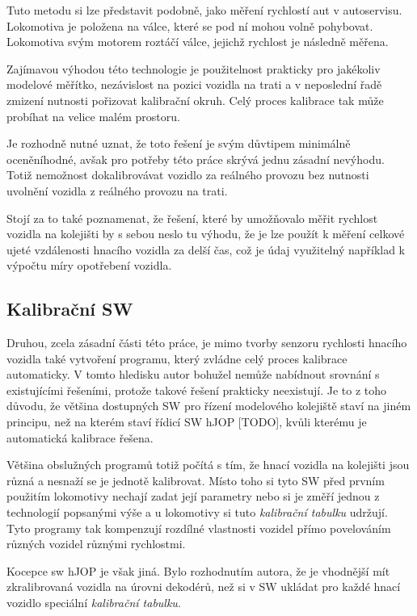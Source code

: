 \documentclass[12pt,a4paper]{article}
\begin{document}
Tuto metodu si lze představit podobně, jako měření rychlostí aut v autoservisu.
Lokomotiva je položena na válce, které se pod ní mohou volně pohybovat. Lokomotiva
svým motorem roztáčí válce, jejichž rychlost je následně měřena.

Zajímavou výhodou této technologie je použitelnost prakticky pro jakékoliv
modelové měřítko, nezávislost na pozici vozidla na trati a v neposlední řadě
zmizení nutnosti pořizovat kalibrační okruh. Celý proces kalibrace tak může
probíhat na velice malém prostoru.

Je rozhodně nutné uznat, že toto řešení je svým důvtipem minimálně oceněníhodné,
avšak pro potřeby této práce skrývá jednu zásadní nevýhodu. Totiž nemožnost
dokalibrovávat vozidlo za reálného provozu bez nutnosti uvolnění vozidla
z reálného provozu na trati.

Stojí za to také poznamenat, že řešení, které by umožňovalo měřit rychlost vozidla
na kolejišti by s sebou neslo tu výhodu, že je lze použít k měření celkové
ujeté vzdálenosti hnacího vozidla za delší čas, což je údaj využitelný například
k výpočtu míry opotřebení vozidla.

\subsection{Kalibrační SW}

Druhou, zcela zásadní části této práce, je mimo tvorby senzoru rychlosti hnacího
vozidla také vytvoření programu, který zvládne celý proces kalibrace automaticky.
V tomto hledisku autor bohužel nemůže nabídnout srovnání s existujícími řešeními,
protože takové řešení prakticky neexistují. Je to z toho důvodu, že většina
dostupných SW pro řízení modelového kolejiště staví na jiném principu, než na
kterém staví řídicí SW hJOP [TODO], kvůli kterému je automatická kalibrace
řešena.

Většina obslužných programů totiž počítá s tím, že hnací vozidla na kolejišti
jsou různá a nesnaží se je jednotě kalibrovat. Místo toho si tyto SW před prvním
použitím lokomotivy nechají zadat její parametry nebo si je změří jednou
z technologií popsanými výše a u lokomotivy si tuto \textit{kalibrační tabulku}
udržují. Tyto programy tak kompenzují rozdílné vlastnosti vozidel přímo povelováním
různých vozidel různými rychlostmi.

Kocepce sw hJOP je však jiná. Bylo rozhodnutím autora, že je vhodnější mít
zkralibrovaná vozidla na úrovni dekodérů, než si v SW ukládat pro každé hnací
vozidlo speciální \textit{kalibrační tabulku}.
\end{document}
